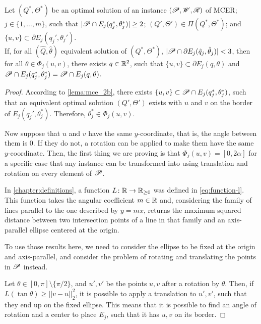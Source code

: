 \begin{lema}\label{lema:3pnts}
Let $(Q^*, \Theta^*)$ be an optimal solution of an instance $(\mathscr{P}, \mathscr{W}, \mathscr{R})$ of MCER; \\$j\in\{1, \dots, m\}$, such that $|\mathscr{P} \cap E_j(q_j^*, \theta_j^*)|\ge2$; $(Q', \Theta')\in\Pi(Q^*, \Theta^*)$; and $\{u, v\}\subset \partial E_j(q_j', \theta_j')$.\\
If, for all $(\hat{Q}, \hat{\theta})$ equivalent solution of $(Q^*, \Theta^*)$, $|\mathscr{P}\cap \partial E_j(\hat{q}_j, \hat{\theta}_j)| < 3$, then for all $\theta\in\Phi_j(u,v)$, there exists $q\in\mathbb{R}^2$, such that $\{u, v\} \subset \partial E_j(q, \theta)$ and $\mathscr{P} \cap E_j(q^*_j, \theta^*_j) = \mathscr{P} \cap E_j(q, \theta)$.

\end{lema}

\begin{proof}
	According to \autoref{lema:mce_2b}, there exists $\{u, v\} \subset \mathscr{P} \cap E_j(q^*_j, \theta^*_j)$, such that an equivalent optimal solution $(Q', \Theta')$ exists with $u$ and $v$ on the border of $E_j(q_j', \theta_j^*)$. Therefore, $\theta_j^*\in\Phi_j(u,v)$.
	
	Now suppose that $u$ and $v$ have the same $y$-coordinate, that is, the angle between them is $0$. If they do not, a rotation can be applied to make them have the same $y$-coordinate. Then, the first thing we are proving is that $\Phi_j(u, v) = [0, 2\alpha]$ for a specific case that any instance can be transformed into using translation and rotation on every element of $\mathscr{P}$.
	
	In \autoref{chapter:definitions}, a function $L\colon \mathbb{R} \to \mathbb{R}_{\ge0}$ was defined in \autoref{eq:function-l}. This function takes the angular coefficient $m\in\mathbb{R}$ and, considering the family of lines parallel to the one described by $y=mx$, returns the maximum squared distance between two intersection points of a line in that family and an axis-parallel ellipse centered at the origin.
	
	To use those results here, we need to consider the ellipse to be fixed at the origin and axis-parallel, and consider the problem of rotating and translating the points in $\mathscr{P}$ instead. 
	
	Let $\theta \in [0, \pi]\setminus\{\pi/2\}$, and $u', v'$ be the points $u, v$ after a rotation by $\theta$. Then, if $L(\tan{\theta}) \ge ||v-u||_2^2$, it is possible to apply a translation to $u',v'$, such that they end up on the fixed ellipse. This means that it is possible to find an angle of rotation and a center to place $E_j$, such that it has $u, v$ on its border. 
	

\end{proof}
